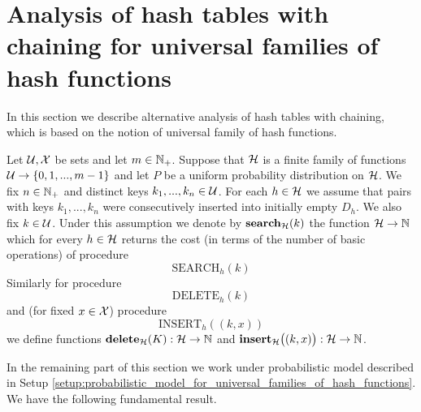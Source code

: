 \section{Analysis of hash tables with chaining for universal families of hash functions}
\noindent
In this section we describe alternative analysis of hash tables with chaining, which is based on the notion of universal family of hash functions.

\begin{setup}\label{setup:probabilistic_model_for_universal_families_of_hash_functions}
Let ${\mathcal U},{\mathcal X}$ be sets and let $m\in {\mathbb N}_+$. Suppose that ${\mathcal H}$ is a finite family of functions ${\mathcal U}\rightarrow \{0,1,...,m-1\}$ and let $P$ be a uniform probability distribution on ${\mathcal H}$. We fix $n\in {\mathbb N}_+$ and distinct keys $k_1,...,k_n\in {\mathcal U}$. For each $h\in {\mathcal H}$ we assume that pairs with keys $k_1,...,k_n$ were consecutively inserted into initially empty $D_h$. We also fix $k\in {\mathcal U}$. Under this assumption we denote by $\mathbf{search}_{\mathcal H}(k)$ the function ${\mathcal H}\rightarrow {\mathbb N}$ which for every $h\in {\mathcal H}$ returns the cost (in terms of the number of basic operations) of procedure 
$$\mathrm{SEARCH}_h(k)$$
Similarly for procedure
$$\mathrm{DELETE}_h(k)$$ 
and (for fixed $x\in {\mathcal X}$) procedure
$$\mathrm{INSERT}_h\left((k,x)\right)$$
we define functions $\mathbf{delete}_{\mathcal H}(K):{\mathcal H} \rightarrow {\mathbb N}$ and $\mathbf{insert}_{\mathcal H}\big((k,x)\big):{\mathcal H} \rightarrow {\mathbb N}$.
\end{setup}
\noindent
In the remaining part of this section we work under probabilistic model described in Setup \ref{setup:probabilistic_model_for_universal_families_of_hash_functions}. We have the following fundamental result.

